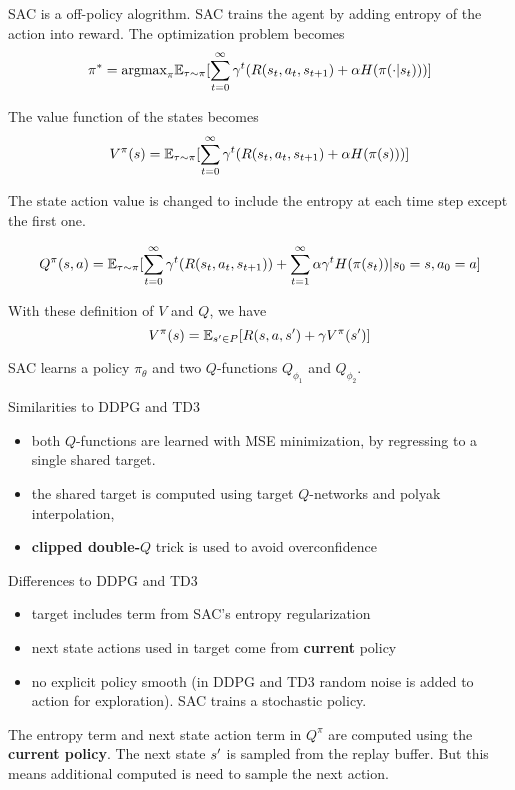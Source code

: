 \documentclass{article}
\begin{document}
SAC is a off-policy alogrithm. 
SAC trains the agent by adding entropy of the action into reward. The 
optimization problem becomes 
\[
    \pi^{*} = \text{argmax}_{\pi} \mathbb{E}_{\tau \sim \pi}[
        \sum_{t=0}^{\infty}\gamma^t(R(s_t, a_t, s_{t+1}) + \alpha 
        H(\pi(\cdot | s_t)))]
\]

The value function of the states becomes
\[
    V^{\pi}(s) = \mathbb{E}_{\tau\sim\pi}[
        \sum_{t=0}^{\infty} \gamma^t (
        R(s_t, a_t, s_{t+1}) + \alpha H(\pi(s))
        )]
\]

The state action value is changed to include the entropy at each time
step except the first one.  

\[
    Q^{\pi}(s, a) = \mathbb{E}_{\tau\sim\pi} [
        \sum_{t=0}^{\infty}\gamma^t(
        R(s_t, a_t, s_{t+1}))
        + \sum_{t=1}^{\infty}\alpha \gamma^t H(\pi(s_t)) 
        | s_0=s, a_0=a]
\]

With these definition of $V$ and $Q$, we have
\[
    V^{\pi}(s) = \mathbb{E}_{s^{\prime}\in P}[R(s, a, s^{\prime}) + \gamma V^{\pi}(s^{\prime})]
\]

SAC learns a policy $\pi_{\theta}$ and two $Q$-functions $Q_{\phi_1}$ and 
$Q_{\phi_2}$. 

Similarities to DDPG and TD3
\begin{itemize}
    \item both $Q$-functions are learned with MSE minimization, by regressing to a single shared target.
    \item the shared target is computed using target $Q$-networks and 
        polyak interpolation,
    \item \textbf{clipped double-$Q$} trick is used to avoid 
        overconfidence
\end{itemize}

Differences to DDPG and TD3
\begin{itemize}
    \item target includes term from SAC's entropy regularization
    \item next state actions used in target come from \textbf{current}
        policy
    \item no explicit policy smooth (in DDPG and TD3 random noise is 
        added to action for exploration). SAC trains a stochastic
        policy.
\end{itemize}

The entropy term and next state action term in $Q^{\pi}$ are computed
using the \textbf{current policy}. The next state $s^{\prime}$ is sampled
from the replay buffer. But this means additional computed
is need to sample the next action. 
\end{document}
